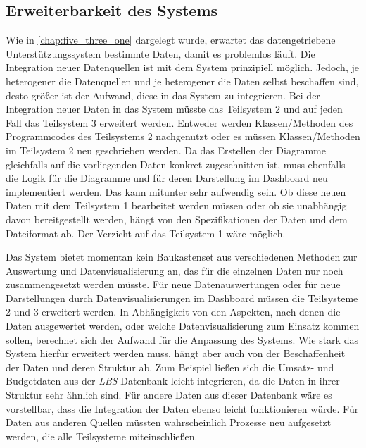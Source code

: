     \subsection{Erweiterbarkeit des Systems}
    Wie in \autoref{chap:five_three_one} dargelegt wurde, erwartet das datengetriebene Unterstützungssystem bestimmte Daten,
    damit es problemlos läuft. Die Integration neuer Datenquellen ist mit dem System prinzipiell möglich. 
    Jedoch, je heterogener die Datenquellen und je heterogener die Daten selbst beschaffen sind, 
    desto größer ist der Aufwand, diese in das System zu integrieren. Bei der Integration neuer Daten in 
    das System müsste das Teilsystem 2 und auf jeden Fall das Teilsystem 3 erweitert werden.
    Entweder werden Klassen/Methoden des Programmcodes des Teilsystems 2 nachgenutzt oder es 
    müssen Klassen/Methoden im Teilsystem 2 neu geschrieben werden. Da das Erstellen der Diagramme gleichfalls auf die vorliegenden 
    Daten konkret zugeschnitten ist, muss ebenfalls die Logik für die Diagramme und für deren Darstellung im Dashboard
    neu implementiert werden. Das kann mitunter sehr aufwendig sein. Ob diese neuen Daten mit dem Teilsystem 1 bearbeitet
    werden müssen oder ob sie unabhängig davon bereitgestellt werden, hängt von den Spezifikationen der Daten und dem
    Dateiformat ab. Der Verzicht auf das Teilsystem 1 wäre möglich.

    Das System bietet momentan kein Baukastenset aus verschiedenen Methoden zur Auswertung 
    und Datenvisualisierung an, das für die einzelnen Daten nur noch zusammengesetzt
    werden müsste. Für neue Datenauswertungen oder für neue Darstellungen durch Datenvisualisierungen 
    im Dashboard müssen die Teilsysteme 2 und 3 erweitert werden. In Abhängigkeit von den Aspekten, nach denen
    die Daten ausgewertet werden, oder welche Datenvisualisierung zum Einsatz kommen sollen,
    berechnet sich der Aufwand für die Anpassung des Systems. 
    Wie stark das System hierfür erweitert werden muss, hängt aber auch von der Beschaffenheit der Daten und deren Struktur ab. 
    Zum Beispiel ließen sich die Umsatz- und Budgetdaten aus der \textit{\acrshort{LBS}}-Datenbank leicht integrieren, da die Daten 
    in ihrer Struktur sehr ähnlich sind. Für andere Daten aus dieser Datenbank wäre es vorstellbar,
    dass die Integration der Daten ebenso leicht funktionieren würde. Für Daten aus anderen Quellen
    müssten wahrscheinlich Prozesse neu aufgesetzt werden, die alle Teilsysteme miteinschließen.


